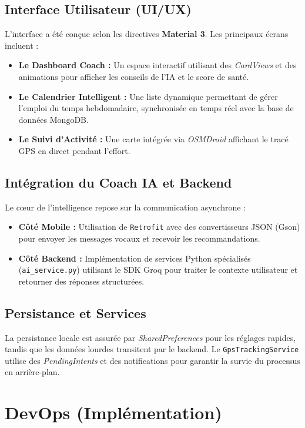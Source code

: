 \documentclass[12pt,a4paper,oneside]{report}
\begin{document}
\subsection{Interface Utilisateur (UI/UX)}
L'interface a été conçue selon les directives \textbf{Material 3}. Les principaux écrans incluent :
\begin{itemize}
    \item \textbf{Le Dashboard Coach :} Un espace interactif utilisant des \textit{CardViews} et des animations pour afficher les conseils de l'IA et le score de santé.
    \item \textbf{Le Calendrier Intelligent :} Une liste dynamique permettant de gérer l'emploi du temps hebdomadaire, synchronisée en temps réel avec la base de données MongoDB.
    \item \textbf{Le Suivi d'Activité :} Une carte intégrée via \textit{OSMDroid} affichant le tracé GPS en direct pendant l'effort.
\end{itemize}

\subsection{Intégration du Coach IA et Backend}
Le cœur de l'intelligence repose sur la communication asynchrone :
\begin{itemize}
    \item \textbf{Côté Mobile :} Utilisation de \texttt{Retrofit} avec des convertisseurs JSON (Gson) pour envoyer les messages vocaux et recevoir les recommandations.
    \item \textbf{Côté Backend :} Implémentation de services Python spécialisés (\texttt{ai\_service.py}) utilisant le SDK Groq pour traiter le contexte utilisateur et retourner des réponses structurées.
\end{itemize}

\subsection{Persistance et Services}
La persistance locale est assurée par \textit{SharedPreferences} pour les réglages rapides, tandis que les données lourdes transitent par le backend. Le \texttt{GpsTrackingService} utilise des \textit{PendingIntents} et des notifications pour garantir la survie du processus en arrière-plan.

\section{DevOps (Implémentation)}
\end{document}
